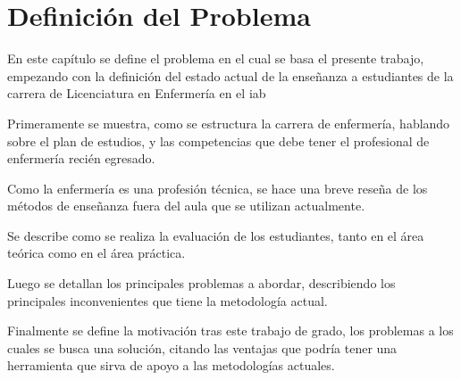 \chapter{Definición del Problema}
\label{chap:problema}




En este capítulo se define el problema en el cual se basa el presente trabajo, 
empezando con la definición del estado actual de la enseñanza a estudiantes de la 
carrera de Licenciatura en Enfermería en el \Gls{iab}

Primeramente se muestra, como se estructura la carrera de enfermería, hablando sobre
el plan de estudios, y las competencias que debe tener el profesional de
enfermería recién egresado.

Como la enfermería es una profesión técnica, se hace una breve reseña de los
métodos de enseñanza fuera del aula que se utilizan actualmente.

Se describe como se realiza la evaluación de los estudiantes, tanto en el área
teórica como en el área práctica.

Luego se detallan los principales problemas a abordar, describiendo los
principales inconvenientes que tiene la metodología actual.

Finalmente se define la motivación tras este trabajo de grado, los problemas a los
cuales se busca una solución, citando las ventajas que podría tener una herramienta
que sirva de apoyo a las metodologías actuales.




